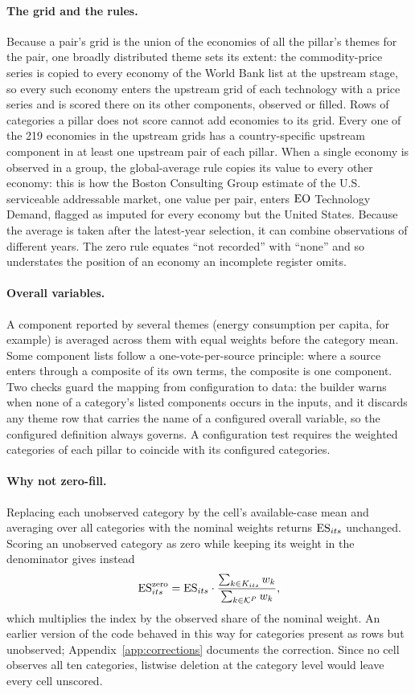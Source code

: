 \paragraph{The grid and the rules.} Because a pair's grid is the union of the economies of all the
pillar's themes for the pair, one broadly distributed theme sets its extent: the commodity-price
series is copied to every economy of the World Bank list at the upstream stage, so every such
economy enters the upstream grid of each technology with a price series and is scored there on its
other components, observed or filled. Rows of categories a pillar does not score cannot add
economies to its grid. Every one of the 219 economies in the upstream grids has a country-specific
upstream component in at least one upstream pair of each pillar. When a single economy is observed
in a group, the global-average rule copies its value to every other economy: this is how the Boston
Consulting Group estimate of the U.S. serviceable addressable market, one value per pair, enters
$\mathrm{EO}$ Technology Demand, flagged as imputed for every economy but the United States. Because the
average is taken after the latest-year selection, it can combine observations of different years.
The zero rule equates ``not recorded'' with ``none'' and so understates the position of an economy
an incomplete register omits.

\paragraph{Overall variables.} A component reported by several themes (energy consumption per
capita, for example) is averaged across them with equal weights before the category mean. Some
component lists follow a one-vote-per-source principle: where a source enters through a composite
of its own terms, the composite is one component. Two checks guard the mapping from configuration
to data: the builder warns when none of a category's listed components occurs in the inputs, and
it discards any theme row that carries the name of a configured overall variable, so the
configured definition always governs. A configuration test requires the weighted categories of each
pillar to coincide with its configured categories.

\paragraph{Why not zero-fill.} Replacing each unobserved category by the cell's available-case
mean and averaging over all categories with the nominal weights returns $\mathrm{ES}_{its}$ unchanged.
Scoring an unobserved category as zero while keeping its weight in the denominator gives instead
\begin{equation}\label{eq:zero_fill}
  \mathrm{ES}^{\text{zero}}_{its}=\mathrm{ES}_{its}\cdot
  \frac{\sum_{k\in K_{its}}w_k}{\sum_{k\in\mathcal{K}^{P}}w_k},
\end{equation}
which multiplies the index by the observed share of the nominal weight. An earlier version of the
code behaved in this way for categories present as rows but unobserved; Appendix~\ref{app:corrections} documents the
correction. Since no cell observes all ten categories, listwise deletion at the category level
would leave every cell unscored.

